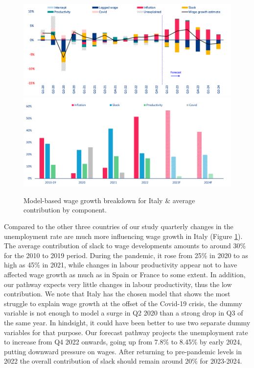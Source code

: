 \begin{figure}[H]
    \centering
    \caption{Model-based wage growth breakdown for Italy \& average contribution by component.}
    \includegraphics[width=.8\textwidth]{Core/2.Labour/img/italyb1.png}
    \includegraphics[width=.8\textwidth]{Core/2.Labour/img/italyb2.png}
    \label{figure:itbreakdown}
\end{figure}

Compared to the other three countries of our study quarterly changes in the unemployment rate are much more influencing wage growth in Italy (Figure \ref{figure:itbreakdown}). 
The average contribution of slack to wage developments amounts to around 30\% for the 2010 to 2019 period. 
During the pandemic, it rose from 25\% in 2020 to as high as 45\% in 2021, while changes in labour productivity appear not to have affected wage growth as much as in Spain or France to some extent. 
In addition, our pathway expects very little changes in labour productivity, thus the low contribution. 
We note that Italy has the chosen model that shows the most struggle to explain wage growth at the offset of the Covid-19 crisis, the dummy variable is not enough to model a surge in Q2 2020 than a strong drop in Q3 of the same year. 
In hindsight, it could have been better to use two separate dummy variables for that purpose. 
Our forecast pathway projects the unemployment rate to increase from Q4 2022 onwards, going up from 7.8\% to 8.45\% by early 2024, putting downward pressure on wages. 
After returning to pre-pandemic levels in 2022 the overall contribution of slack should remain around 20\% for 2023-2024. 

